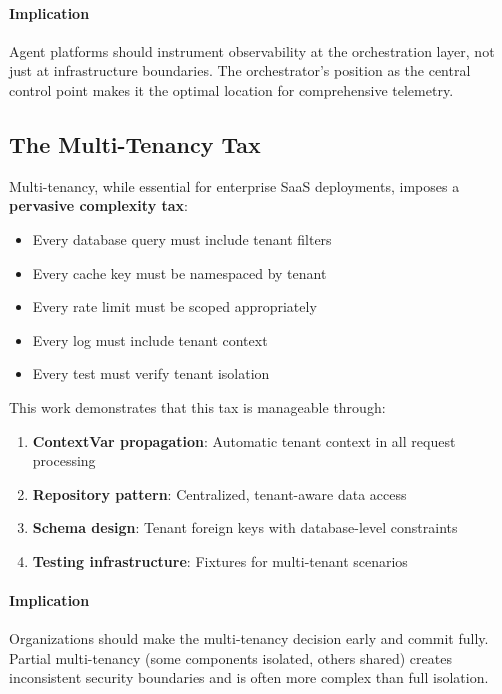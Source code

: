 \paragraph{Implication}
Agent platforms should instrument observability at the orchestration layer, not just at infrastructure boundaries. The orchestrator's position as the central control point makes it the optimal location for comprehensive telemetry.

\subsection{The Multi-Tenancy Tax}

Multi-tenancy, while essential for enterprise SaaS deployments, imposes a \textbf{pervasive complexity tax}:

\begin{itemize}
    \item Every database query must include tenant filters
    \item Every cache key must be namespaced by tenant
    \item Every rate limit must be scoped appropriately
    \item Every log must include tenant context
    \item Every test must verify tenant isolation
\end{itemize}

This work demonstrates that this tax is manageable through:

\begin{enumerate}
    \item \textbf{ContextVar propagation}: Automatic tenant context in all request processing
    \item \textbf{Repository pattern}: Centralized, tenant-aware data access
    \item \textbf{Schema design}: Tenant foreign keys with database-level constraints
    \item \textbf{Testing infrastructure}: Fixtures for multi-tenant scenarios
\end{enumerate}

\paragraph{Implication}
Organizations should make the multi-tenancy decision early and commit fully. Partial multi-tenancy (some components isolated, others shared) creates inconsistent security boundaries and is often more complex than full isolation.

